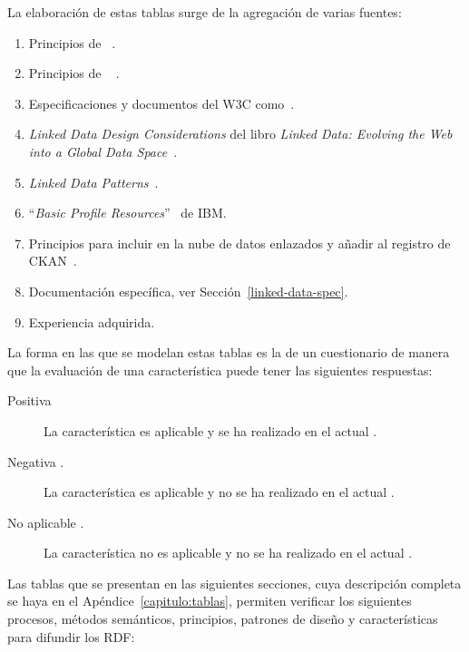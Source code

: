 La elaboración de estas tablas surge de la agregación de varias fuentes:
\begin{enumerate}
 \item Principios de \linkeddata~\cite{Berners-Lee-2006}.
 \item Principios de \opendata~\cite{okfn} . 
 \item Especificaciones y documentos del \gls{W3C} como~\cite{publishing-ogd,linked-data-cookbook,Berr08}. 
 \item \textit{Linked Data Design Considerations} del libro \textit{Linked Data: Evolving the Web into a Global Data Space}~\cite{Heath_Bizer_2011}.
 \item \textit{Linked Data Patterns}~\cite{linked-data-patterns}.
 \item ``\textit{Basic Profile Resources}''~\cite{basic-profile-ibm} de IBM.
 \item Principios para incluir \datasets en la nube de datos enlazados y añadir al registro de \gls{CKAN}~\cite{ckanValidator}.
 \item Documentación específica, ver Sección~\ref{linked-data-spec}.
 \item Experiencia adquirida.
\end{enumerate}

La forma en las que se modelan estas tablas es la de un cuestionario de manera que la evaluación de una característica puede tener las siguientes respuestas:
\begin{description}
 \item [Positiva \si.] La característica es aplicable y se ha realizado en el actual \dataset.
 \item [Negativa \no.] La característica es aplicable y no se ha realizado en el actual \dataset.
 \item [No aplicable \na.] La característica no es aplicable y no se ha realizado en el actual \dataset.
\end{description}

Las tablas que se presentan en las siguientes secciones, cuya descripción completa se haya en el Apéndice~\ref{capitulo:tablas}, permiten verificar los siguientes
procesos, métodos semánticos, principios, patrones de diseño y características para difundir los \datasets \gls{RDF}:

